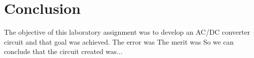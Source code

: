 \newpage
\section{Conclusion}
\label{sec:conclusion}


The objective of this laboratory assignment was to develop an AC/DC converter circuit and that goal was achieved.
The error was
The merit was
So we can conclude that the circuit created was...


